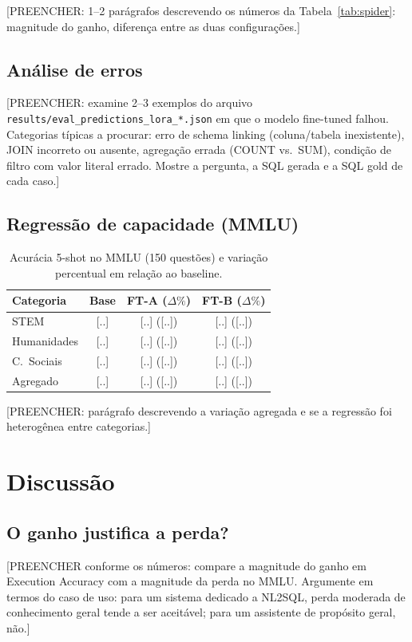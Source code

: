 \documentclass[conference]{IEEEtran}
\begin{document}
[PREENCHER: 1--2 parágrafos descrevendo os números da
Tabela~\ref{tab:spider}: magnitude do ganho, diferença entre as duas
configurações.]

\subsection{Análise de erros}
[PREENCHER: examine 2--3 exemplos do arquivo
\texttt{results/eval\_predictions\_lora\_*.json} em que o modelo
fine-tuned falhou. Categorias típicas a procurar: erro de schema linking
(coluna/tabela inexistente), JOIN incorreto ou ausente, agregação errada
(COUNT vs.\ SUM), condição de filtro com valor literal errado. Mostre a
pergunta, a SQL gerada e a SQL gold de cada caso.]

\subsection{Regressão de capacidade (MMLU)}

\begin{table}[ht]
\centering
\caption{Acurácia 5-shot no MMLU (150 questões) e variação percentual em
relação ao baseline.}
\label{tab:mmlu}
\begin{tabular}{lccc}
\toprule
Categoria & Base & FT-A ($\Delta\%$) & FT-B ($\Delta\%$) \\
\midrule
STEM & [..] & [..] ([..]) & [..] ([..]) \\
Humanidades & [..] & [..] ([..]) & [..] ([..]) \\
C.\ Sociais & [..] & [..] ([..]) & [..] ([..]) \\
\midrule
Agregado & [..] & [..] ([..]) & [..] ([..]) \\
\bottomrule
\end{tabular}
\end{table}

[PREENCHER: parágrafo descrevendo a variação agregada e se a regressão
foi heterogênea entre categorias.]

\section{Discussão}

\subsection{O ganho justifica a perda?}
[PREENCHER conforme os números: compare a magnitude do ganho em
Execution Accuracy com a magnitude da perda no MMLU. Argumente em termos
do caso de uso: para um sistema dedicado a NL2SQL, perda moderada de
conhecimento geral tende a ser aceitável; para um assistente de
propósito geral, não.]
\end{document}
